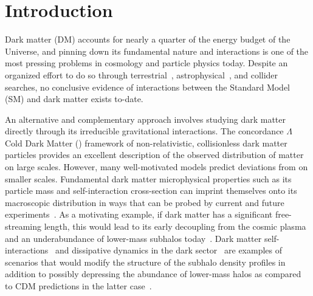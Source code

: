 \documentclass[twocolumn]{aastex63}
\begin{document}

\tableofcontents{}

\section{Introduction}
\label{sec:intro}

Dark matter (DM) accounts for nearly a quarter of the energy budget of the Universe, and pinning down its fundamental nature and interactions is one of the most pressing problems in cosmology and particle physics today. Despite an organized effort to do so through terrestrial~\citep[\eg,][]{2017PhRvL.118b1303A,2017PhRvL.119r1302C,2018PhRvL.121k1302A}, astrophysical~\citep[\eg,][]{2017ApJ...834..110A,2018PhRvD..98l3004C,2018PhRvL.120j1101L}, and collider~\citep[\eg,][]{2017PhLB..769..520S,2019arXiv190301400A} searches, no conclusive evidence of interactions between the Standard Model (SM) and dark matter exists to-date.

An alternative and complementary approach involves studying dark matter directly through its irreducible gravitational interactions. The concordance $\Lambda$ Cold Dark Matter (\lcdm) framework of non-relativistic, collisionless dark matter particles provides an excellent description of the observed distribution of matter on large scales. However, many well-motivated models predict deviations from \lcdm on smaller scales. Fundamental dark matter microphysical properties such as its particle mass and self-interaction cross-section can imprint themselves onto its macroscopic distribution in ways that can be probed by current and future experiments~\citep{1712.06615,2019arXiv190201055D,1903.04742}. As a motivating example, if dark matter has a significant free-streaming length, this would lead to its early decoupling from the cosmic plasma and an underabundance of lower-mass subhalos today~\citep{1983ApJ...274..443B,2001ApJ...556...93B,astro-ph/0004381,0807.0622,1008.0992}. Dark matter self-interactions~\citep{astro-ph/9909386,astro-ph/0006134,astro-ph/0006218,astro-ph/0205322,1201.5892,1208.3026,1211.6426,1311.6524,1508.03339,1611.02716,1609.08626,1805.03203,1904.10539,1901.00499,1903.01469} and dissipative dynamics in the dark sector~\citep{1303.1521,1702.05482,1706.04195,1707.03829} are examples of scenarios that would modify the structure of the subhalo density profiles in addition to possibly depressing the abundance of lower-mass halos as compared to CDM predictions in the latter case~\citep{1405.2075,1412.4905,1512.05349}.
\end{document}
